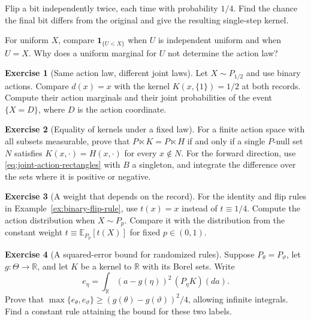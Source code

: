 \documentclass[11pt,oneside]{book}
\theoremstyle{definition}
\newtheorem{exercise}{Exercise}[section]
\theoremstyle{remark}
\newcommand{\R}{\mathbb R}
\begin{document}
\begin{practiceexercise}
\label{wex:two-random-flips}
Flip a bit independently twice, each time with probability $1/4$. Find the
chance the final bit differs from the original and give the resulting
single-step kernel.
\end{practiceexercise}

\begin{practiceexercise}
\label{wex:dependent-auxiliary-draw}
For uniform $X$, compare $\mathbf1_{\{U<X\}}$ when $U$ is independent
uniform and when $U=X$. Why does a uniform marginal for $U$ not determine
the action law?
\end{practiceexercise}

\begin{exercise}[Same action law, different joint laws]
\label{exer:action-versus-joint-law}
Let $X\sim P_{1/2}$ and use binary actions. Compare $d(x)=x$ with the
kernel $K(x,\{1\})=1/2$ at both records. Compute their action marginals and
their joint probabilities of the event $\{X=D\}$, where $D$ is the action
coordinate.
\end{exercise}

\begin{exercise}[Equality of kernels under a fixed law]
\label{exer:joint-law-kernel-equality}
For a finite action space with all subsets measurable, prove that
$P\ltimes K=P\ltimes H$ if and only if a single $P$-null set $N$ satisfies
$K(x,\cdot)=H(x,\cdot)$ for every $x\notin N$. For the forward direction,
use \eqref{eq:joint-action-rectangles} with $B$ a singleton, and integrate
the difference over the sets where it is positive or negative.
\end{exercise}

\begin{exercise}[A weight that depends on the record]
\label{exer:record-dependent-rule-mixture}
For the identity and flip rules in Example~\ref{ex:binary-flip-rule},
use $t(x)=x$ instead of $t\equiv1/4$. Compute the action distribution
when $X\sim P_p$. Compare it with the distribution from the constant
weight $t\equiv\mathbb E_{P_p}[t(X)]$ for fixed $p\in(0,1)$.
\end{exercise}

\begin{exercise}[A squared-error bound for randomized rules]
\label{exer:randomized-recovery-bound}
Suppose $P_\theta=P_\vartheta$, let $g:\Theta\to\R$, and let $K$ be a
kernel to $\R$ with its Borel sets. Write
\[
e_\eta=\int_{\R}(a-g(\eta))^2\,(P_\eta K)(da).
\]
Prove that $\max\{e_\theta,e_\vartheta\}\geq
(g(\theta)-g(\vartheta))^2/4$, allowing infinite integrals. Find a constant
rule attaining the bound for these two labels.
\end{exercise}
\end{document}
